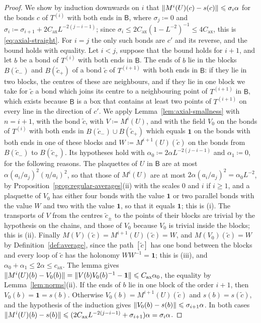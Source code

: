 \documentclass[11pt]{preprint}
\newcommand{\id}{\mathbf 1}
\DeclarePairedDelimiter{\norm}{\lVert}{\rVert}
\numberwithin{equation}{section}
\begin{document}
\begin{proof}
We show by induction downwards on $i$ that $\norm{M^i(U)(c) - s(c)} \leqslant \sigma_i\alpha$ for the bonds $c$ of $T^{(i)}$ with both ends in $\mathsf B$, where $\sigma_j \coloneqq 0$ and $\sigma_i \coloneqq \sigma_{i+1} + 2C_{\mathrm{ax}}L^{-2(j-i-1)}$; since $\sigma_i \leqslant 2C_{\mathrm{ax}}(1 - L^{-2})^{-1} \leqslant 4C_{\mathrm{ax}}$, this is \eqref{eq:axial-straight}. For $i = j$ the only such bonds are $c'$ and its reverse, and the bound holds with equality. Let $i < j$, suppose that the bound holds for $i + 1$, and let $b$ be a bond of $T^{(i)}$ with both ends in $\mathsf B$. The ends of $b$ lie in the blocks $B(\tilde c_-)$ and $B(\tilde c_+)$ of a bond $\tilde c$ of $T^{(i+1)}$ with both ends in $\mathsf B$: if they lie in two blocks, the centres of these are neighbours, and if they lie in one block we take for $\tilde c$ a bond which joins its centre to a neighbouring point of $T^{(i+1)}$ in $\mathsf B$, which exists because $\mathsf B$ is a box that contains at least two points of $T^{(i+1)}$ on every line in the direction of $c'$. We apply Lemma~\ref{lem:axial-smallness} with $n = i + 1$, with the bond $\tilde c$, with $V \coloneqq M^i(U)$, and with the field $V_0$ on the bonds of $T^{(i)}$ with both ends in $B(\tilde c_-) \cup B(\tilde c_+)$ which equals $\id$ on the bonds with both ends in one of these blocks and $W \coloneqq M^{i+1}(U)(\tilde c)$ on the bonds from $B(\tilde c_-)$ to $B(\tilde c_+)$. Its hypotheses hold with $\alpha_0 \coloneqq 2\alpha L^{-2(j-i-1)}$ and $\alpha_1 \coloneqq 0$, for the following reasons. The plaquettes of $U$ in $\mathsf B$ are at most $\alpha(a_i/a_j)^2(\eta/a_i)^2$, so that those of $M^i(U)$ are at most $2\alpha(a_i/a_j)^2 = \alpha_0L^{-2}$, by Proposition~\ref{prop:regular-averages}(ii) with the scales $0$ and $i$ if $i \geqslant 1$, and a plaquette of $V_0$ has either four bonds with the value $\id$ or two parallel bonds with the value $W$ and two with the value $\id$, so that it equals $\id$; this is (i). The transports of $V$ from the centres $\tilde c_\pm$ to the points of their blocks are trivial by the hypothesis on the chains, and those of $V_0$ because $V_0$ is trivial inside the blocks; this is (ii). Finally $M(V)(\tilde c) = M^{i+1}(U)(\tilde c) = W$, and $M(V_0)(\tilde c) = W$ by Definition~\ref{def:average}, since the path $[\tilde c]$ has one bond between the blocks and every loop of $\tilde c$ has the holonomy $WW^{-1} = \id$; this is (iii), and $\alpha_0 + \alpha_1 \leqslant 2\alpha \leqslant c_{\mathrm{ax}}$. The lemma gives $\norm{M^i(U)(b) - V_0(b)} =\norm{V(b)V_0(b)^{-1} - \id} \leqslant C_{\mathrm{ax}}\alpha_0$, the equality by Lemma~\ref{lem:norms}(ii). If the ends of $b$ lie in one block of the order $i + 1$, then $V_0(b) = \id = s(b)$. Otherwise $V_0(b) = M^{i+1}(U)(\tilde c)$ and $s(b) = s(\tilde c)$, and the hypothesis of the induction gives $\norm{V_0(b) - s(b)} \leqslant \sigma_{i+1}\alpha$. In both cases $\norm{M^i(U)(b) - s(b)} \leqslant (2C_{\mathrm{ax}}L^{-2(j-i-1)} + \sigma_{i+1})\alpha = \sigma_i\alpha$.
\end{proof}
\end{document}
